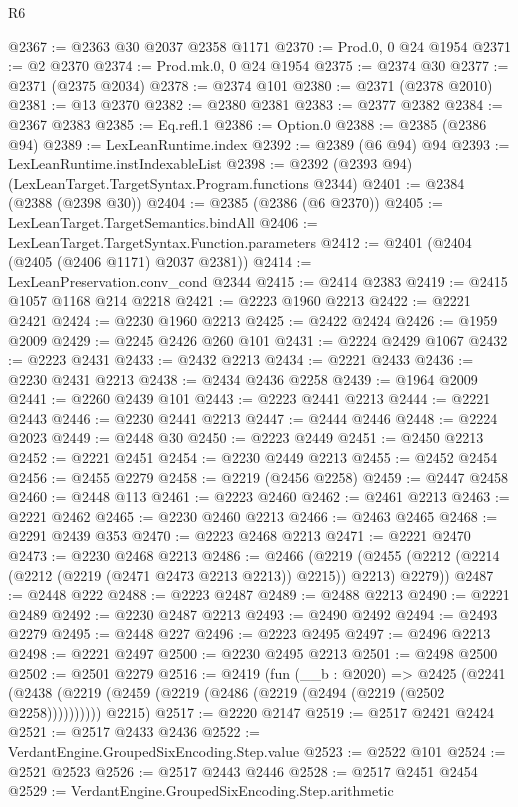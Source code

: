 \begin{lexlean}{R6}
\begin{coremodule}
@2367 := @2363 @30 @2037 @2358 @1171
@2370 := Prod.{0, 0} @24 @1954
@2371 := @2 @2370
@2374 := Prod.mk.{0, 0} @24 @1954
@2375 := @2374 @30
@2377 := @2371 (@2375 @2034)
@2378 := @2374 @101
@2380 := @2371 (@2378 @2010)
@2381 := @13 @2370
@2382 := @2380 @2381
@2383 := @2377 @2382
@2384 := @2367 @2383
@2385 := Eq.refl.{1}
@2386 := Option.{0}
@2388 := @2385 (@2386 @94)
@2389 := LexLeanRuntime.index
@2392 := @2389 (@6 @94) @94
@2393 := LexLeanRuntime.instIndexableList
@2398 := @2392 (@2393 @94) (LexLeanTarget.TargetSyntax.Program.functions @2344)
@2401 := @2384 (@2388 (@2398 @30))
@2404 := @2385 (@2386 (@6 @2370))
@2405 := LexLeanTarget.TargetSemantics.bindAll
@2406 := LexLeanTarget.TargetSyntax.Function.parameters
@2412 := @2401 (@2404 (@2405 (@2406 @1171) @2037 @2381))
@2414 := LexLeanPreservation.conv_cond @2344
@2415 := @2414 @2383
@2419 := @2415 @1057 @1168 @214 @2218
@2421 := @2223 @1960 @2213
@2422 := @2221 @2421
@2424 := @2230 @1960 @2213
@2425 := @2422 @2424
@2426 := @1959 @2009
@2429 := @2245 @2426 @260 @101
@2431 := @2224 @2429 @1067
@2432 := @2223 @2431
@2433 := @2432 @2213
@2434 := @2221 @2433
@2436 := @2230 @2431 @2213
@2438 := @2434 @2436 @2258
@2439 := @1964 @2009
@2441 := @2260 @2439 @101
@2443 := @2223 @2441 @2213
@2444 := @2221 @2443
@2446 := @2230 @2441 @2213
@2447 := @2444 @2446
@2448 := @2224 @2023
@2449 := @2448 @30
@2450 := @2223 @2449
@2451 := @2450 @2213
@2452 := @2221 @2451
@2454 := @2230 @2449 @2213
@2455 := @2452 @2454
@2456 := @2455 @2279
@2458 := @2219 (@2456 @2258)
@2459 := @2447 @2458
@2460 := @2448 @113
@2461 := @2223 @2460
@2462 := @2461 @2213
@2463 := @2221 @2462
@2465 := @2230 @2460 @2213
@2466 := @2463 @2465
@2468 := @2291 @2439 @353
@2470 := @2223 @2468 @2213
@2471 := @2221 @2470
@2473 := @2230 @2468 @2213
@2486 := @2466
    (@2219 (@2455 (@2212 (@2214 (@2212 (@2219 (@2471 @2473 @2213 @2213)) @2215)) @2213) @2279))
@2487 := @2448 @222
@2488 := @2223 @2487
@2489 := @2488 @2213
@2490 := @2221 @2489
@2492 := @2230 @2487 @2213
@2493 := @2490 @2492
@2494 := @2493 @2279
@2495 := @2448 @227
@2496 := @2223 @2495
@2497 := @2496 @2213
@2498 := @2221 @2497
@2500 := @2230 @2495 @2213
@2501 := @2498 @2500
@2502 := @2501 @2279
@2516 := @2419
    (fun (__b : @2020) =>
    @2425
      (@2241 (@2438 (@2219 (@2459 (@2219 (@2486 (@2219 (@2494 (@2219 (@2502 @2258))))))))))
      @2215)
@2517 := @2220 @2147
@2519 := @2517 @2421 @2424
@2521 := @2517 @2433 @2436
@2522 := VerdantEngine.GroupedSixEncoding.Step.value
@2523 := @2522 @101
@2524 := @2521 @2523
@2526 := @2517 @2443 @2446
@2528 := @2517 @2451 @2454
@2529 := VerdantEngine.GroupedSixEncoding.Step.arithmetic

\end{coremodule}
\end{lexlean}
